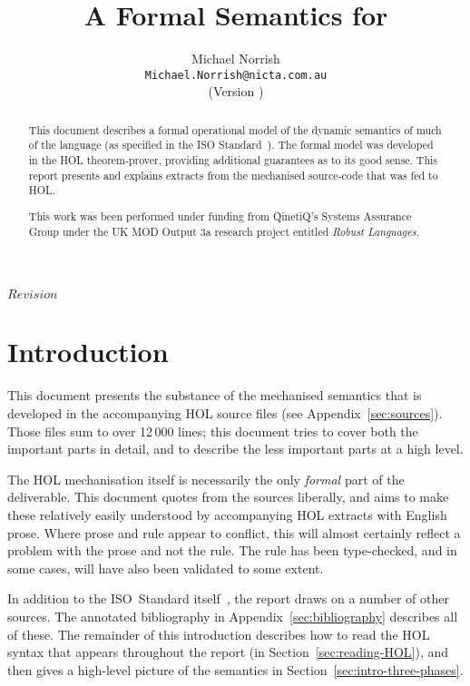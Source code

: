 \documentclass[11pt]{article}
\title{A Formal Semantics for \cpp}
\author{Michael Norrish\\{\small \texttt{Michael.Norrish@nicta.com.au}}\\
{\footnotesize (Version \svnInfoRevision)}}
\date{}
\begin{document}
\svnKeyword $Revision$
\maketitle
\begin{abstract}
  This document describes a formal operational model of the dynamic
  semantics of much of the \cpp{} language (as specified in the ISO
  Standard~\cite{cpp-standard-iso14882}).  The formal model was
  developed in the HOL theorem-prover, providing additional guarantees
  as to its good sense.  This report presents and explains extracts
  from the mechanised source-code that was fed to HOL.

  This work was been performed under funding from QinetiQ's Systems
  Assurance Group under the UK MOD Output 3a research project entitled
  \emph{Robust Languages}.
\end{abstract}

\tableofcontents
\listoffigures

\section{Introduction}

This document presents the substance of the mechanised \cpp{}
semantics that is developed in the accompanying HOL source files (see
Appendix~\ref{sec:sources}).  Those files sum to over 12$\,$000 lines;
this document tries to cover both the important parts in detail, and
to describe the less important parts at a high level.

The HOL mechanisation itself is necessarily the only \emph{formal}
part of the deliverable.  This document quotes from the sources
liberally, and aims to make these relatively easily understood by
accompanying HOL extracts with English prose.  Where prose and rule
appear to conflict, this will almost certainly reflect a problem with
the prose and not the rule.  The rule has been type-checked, and in
some cases, will have also been validated to some extent.

In addition to the ISO~Standard itself~\cite{cpp-standard-iso14882},
the report draws on a number of other sources.  The annotated
bibliography in Appendix~\ref{sec:bibliography} describes all of
these.  The remainder of this introduction describes how to read the
HOL syntax that appears throughout the report (in
Section~\ref{sec:reading-HOL}), and then gives a high-level picture of
the \cpp{} semantics in Section~\ref{sec:intro-three-phases}.
\end{document}
